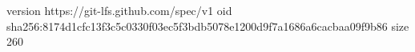 version https://git-lfs.github.com/spec/v1
oid sha256:8174d1cfc13f3c5c0330f03ec5f3bdb5078e1200d9f7a1686a6cacbaa09f9b86
size 260
